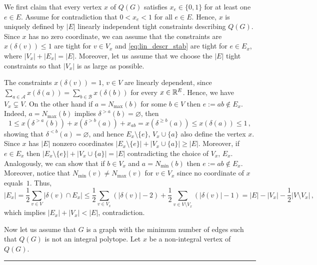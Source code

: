 \documentclass[3p,times]{elsarticle}
\newenvironment{proof}{{\bf Proof:  }}{\hfill\rule{2mm}{2mm}}
\begin{document}
\begin{proof}
  We first claim that every vertex $x$ of $Q(G)$ satisfies $x_e
  \in \{0,1\}$ for at least one $e \in E$. Assume for contradiction
  that $0 < x_e < 1$ for all $e \in E$. Hence, $x$ is uniquely defined 
  by $|E|$ linearly independent tight constraints
  describing $Q(G)$. Since $x$ has no zero coordinate, we can assume
  that the constraints are $x(\delta(v))\le 1$ are tight for $v\in V_x$
  and \eqref{eq:lin_descr_stab} are tight for $e\in E_x$, where
  $|V_x|+|E_x|=|E|$. Moreover, let us assume that we choose the $|E|$
  tight constraints so that $|V_x|$ is as large as possible.

The constraints $x(\delta(v))=1$, $v\in V$ are linearly dependent, since $\sum_{a\in\mathcal{A}}x(\delta(a))=\sum_{b\in\mathcal{B}}x(\delta(b))$ for every $x \in \mathbb{R}^E$. Hence, we have $V_x\subsetneq V$. On the other hand if $a=N_{\max}(b)$ for some $b \in V$ then $e:=ab\not\in E_x$. Indeed, $a=N_{\max}(b)$ implies $\delta^{>a}(b)=\varnothing$, then
$$
	1\le x(\delta^{>a}(b))+ x(\delta^{>b}(a)) + x_{ab}=x(\delta^{\ge b}(a)) \le x(\delta(a)) \le 1\,,
$$
showing that $\delta^{< b}(a)=\varnothing$, and hence $E_x\setminus \{e\}$, $V_x\cup \{a\}$ also define the vertex $x$. Since $x$ has $|E|$ nonzero coordinates $|E_x \setminus \{e\}| + |V_x \cup \{a\}| \geq |E|$. Moreover, if $e \in E_x$ then $|E_x \setminus \{e\}| + |V_x \cup \{a\}| = |E|$ contradicting the choice of $V_x$, $E_x$. Analogously, we can show that if $b\in V_x$  and $a=N_{\min}(b)$ then $e:=ab\not\in E_x$. Moreover, notice that $N_{\min}(v)\neq N_{\max}(v)$ for $v\in V_x$ since no coordinate of $x$ equals~$1$. Thus, 
\[
	|E_x|=\frac{1}{2}\sum_{v\in V} |\delta(v)\cap E_x|\le \frac{1}{2}\sum_{v\in V_x} (|\delta(v)|-2)+\frac{1}{2}\sum_{v\in V\setminus V_x} (|\delta(v)|-1)= |E|-|V_x|-\frac{1}{2}|V\setminus V_x|\,,
\]
which implies $|E_x|+|V_x|< |E|$, contradiction.

\bigskip

Now let us assume that $G$ is a graph with the minimum number of edges such that $Q(G)$ is not an integral polytope. Let $x$ be a non-integral vertex of $Q(G)$.


\end{proof}
\end{document}
